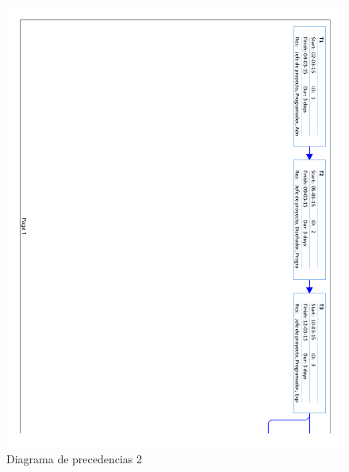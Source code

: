\begin{figure}[!htbp]
	\centering
	\includegraphics[page=2, scale=.65]{fig/real_network_diagram}
	\caption{Diagrama de precedencias 2}
\end{figure}

